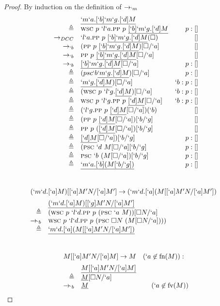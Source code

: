 \begin{proof}{By induction on the definition of $\rightarrow_{`m}$}
\[\begin{array}{rlrl}
               & \underline{`m`a.[`b]`m`g.[`d]M} \\
    \triangleq & \textsc{wsc}\ p\ `l`a.\textsc{pp}\ p\ \underline{[`b]`m`g.[`d]M} & p:[] \\
    \to_{DCC}   & `l`a.\textsc{pp}\ p\ \underline{[`b]`m`g.[`d]M}(\square) & [] \\
    \to_{`b}     & (\textsc{pp}\ p\ \underline{[`b]`m`g.[`d]M})[\square/`a] & [] \\
    \to_{`b}     & \textsc{pp}\ p\ \underline{[`b]`m`g.[`d]M}[\square/`a] & [] \\
    \to_{`b}     & \underline{[`b]`m`g.[`d]M}[\square/`a] & p:[] \\
    \triangleq & (psc `b \underline{`m`g.[`d]M})[\square/`a] & p:[] \\
    \triangleq & \underline{`m`g.[`d]M})[\square/`a] & `b:p:[] \\
    \triangleq & (\textsc{wsc}\ p\ `l`g.\underline{[`d]M})[\square/`a] & `b:p:[] \\
    \triangleq & \textsc{wsc}\ p\ `l`g.\textsc{pp}\ p\ \underline{[`d]M}[\square/`a] & `b:p:[] \\
    \triangleq & (`l`g.\textsc{pp}\ p\ \underline{[`d]M}[\square/`a])(`b) & [] \\
    \triangleq & (\textsc{pp}\ p\ \underline{[`d]M}[\square/`a])[`b/`g] & [] \\
    \triangleq & \textsc{pp}\ p\ (\underline{[`d]M}[\square/`a])[`b/`g] & [] \\
    \triangleq & \underline{[`d]M}[\square/`a])[`b/`g] & p:[] \\
    \triangleq & (\textsc{psc}\ `d\ M[\square/`a][`b/`g] & p:[] \\
    \triangleq & \textsc{psc}\ `b\ (M[\square/`a])[`b/`g] & p:[] \\
    \triangleq & \underline{`m`a.[`b](M[`b/`g])} & p:[]
\end{array}
\]
\\ 
\[
\begin{array}{rlrl}
  \prooflabel{(`m`d.[`a]M)[[`a]M^\prime N/[`a]M^\prime]
    \to (`m`d.[`a](M[[`a]M^\prime N/[`a]M^\prime])} \\
               & \tr{(`m`d.[`a]M)[[`g]M^\prime N/[`a]M^\prime]} \\
    \triangleq & (\wsc\ p\ `l`d.\pp\ p\ (\psc\ `a\ M))[\square N/`a] \\
    \tob\      & \wsc\ p\ `l`d.\pp\ p\ (\psc\ \square N\ (M[\square N/`a]))) \\
    \triangleq & \tr{`m`d.[`a](M[[`a]M^\prime N/[`a]M^\prime])} \\
\end{array}
\]
\\ 
\[
\begin{array}{rlrl}
  \prooflabel{M[[`a]M^\prime N/[`a]M] \to M \hspace{10pt} (`a \not\in \fn(M)):} \\
               & \tr{M[[`a]M^\prime N/[`a]M]} \\
    \triangleq & \tr{M}[\square N/`a] \\
    \tob\      & \tr{M} & (`a \not\in \fv(M))
\end{array}
\]
\end{proof}

